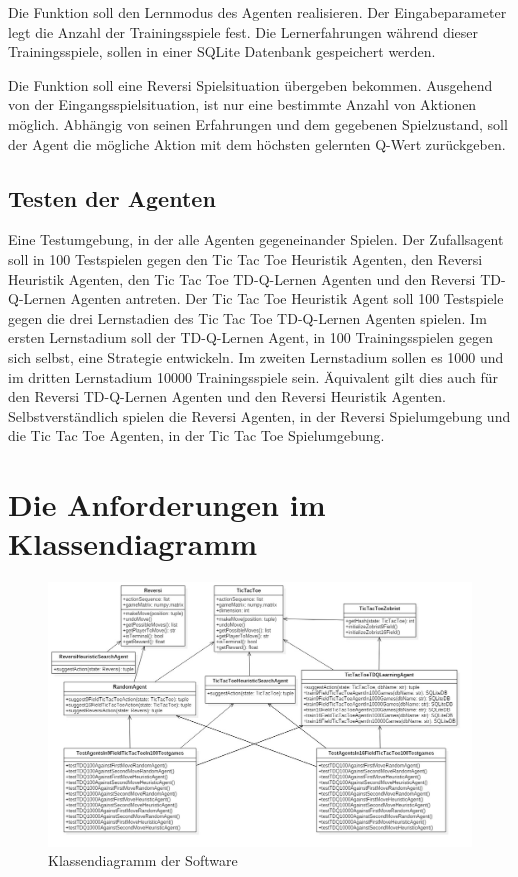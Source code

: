 Die Funktion soll den Lernmodus des Agenten realisieren. Der Eingabeparameter legt die Anzahl der Trainingsspiele fest. Die Lernerfahrungen während dieser Trainingsspiele, sollen in einer SQLite Datenbank gespeichert werden.

Die Funktion soll eine Reversi Spielsituation übergeben bekommen. Ausgehend von der Eingangsspielsituation, ist nur eine bestimmte Anzahl von Aktionen möglich. Abhängig von seinen Erfahrungen und dem gegebenen Spielzustand, soll der Agent die mögliche Aktion mit dem höchsten gelernten Q-Wert zurückgeben.

\subsection{Testen der Agenten}
Eine Testumgebung, in der alle Agenten gegeneinander Spielen. Der Zufallsagent soll in 100 Testspielen gegen den Tic Tac Toe Heuristik Agenten, den Reversi Heuristik Agenten, den Tic Tac Toe TD-Q-Lernen Agenten und den Reversi TD-Q-Lernen Agenten antreten. Der Tic Tac Toe Heuristik Agent soll 100 Testspiele gegen die drei Lernstadien des Tic Tac Toe TD-Q-Lernen Agenten spielen. Im ersten Lernstadium soll der TD-Q-Lernen Agent, in 100 Trainingsspielen gegen sich selbst, eine Strategie entwickeln. Im zweiten Lernstadium sollen es 1000 und im dritten Lernstadium 10000 Trainingsspiele sein. Äquivalent gilt dies auch für den Reversi TD-Q-Lernen Agenten und den Reversi Heuristik Agenten. Selbstverständlich spielen die Reversi Agenten, in der Reversi Spielumgebung und die Tic Tac Toe Agenten, in der Tic Tac Toe Spielumgebung.
\newpage

\section{Die Anforderungen im Klassendiagramm}

\begin{figure}[!htbp]
  \centering
  \includegraphics[angle = 90, scale = 0.5]{inhalt/abbildungen/projectClassDiagram.jpg}
  \caption{Klassendiagramm der Software}
  \label{fig:klassendiagramm}
\end{figure} 
